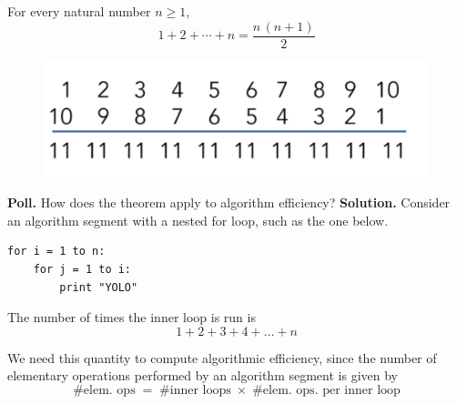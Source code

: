 \documentclass[10pt]{beamer}
\begin{document}
\begin{frame}

\begin{mygreenbox}[title=\text{Theorem: Sum of the first $n$ natural numbers}]

For every natural number $n \geq 1$, 
\[ 1 + 2 + \cdots + n = \frac{n \, (n+1)}{2} \]
\end{mygreenbox}

\vfill 
\pause 
\begin{myredbox}[title=\text{Story: Gauss' solution from elementary school}]
\begin{figure}
\includegraphics[width=\textwidth]{images/gauss_sum.png}	
\end{figure}	
\end{myredbox}
\end{frame}



\begin{frame}[fragile]

\colorbox{yellow!30}{\textbf{Poll.}} How does the theorem apply to algorithm efficiency?
\pause 
\vfill 
\colorbox{green!30}{\textbf{Solution.}} Consider an algorithm segment with a nested for loop, such as the one below.

\begin{myredbox}[title=\text{An algorithm segment with a nested for loop}]
\begin{lstlisting}
for i = 1 to n:
    for j = 1 to i:	
      	print "YOLO"
\end{lstlisting}
\end{myredbox}
\vfill 
\pause 

The number of times the inner loop is run is 
\[1+2+3+4+ \hdots + n \]

We need this quantity to compute algorithmic efficiency, since the number of elementary operations performed by an algorithm segment is given by
\[ \#  \text{elem. ops} \; = \; \#  \text{inner loops}   \; \times \; \#  \text{elem. ops. per inner loop} \]

\end{frame}
\end{document}
